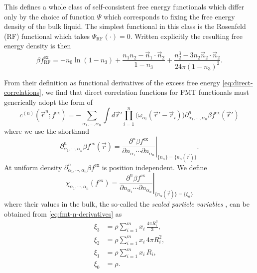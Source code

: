This defines a whole class of self-consistent free energy functionals which differ only by the choice of function $\Psi$ which corresponds to fixing the free energy density of the bulk liquid.
The simplest functional in this class is the Rosenfeld (RF) functional which takes $\Psi_\mathrm{RF}(\cdot) = 0$.
Written explicitly the resulting free energy density is then \cite{RosenfeldPRL1989}
\begin{equation}\label{eq:rosenfeld-functional}
  \beta f_\mathrm{RF}^\mathrm{ex}
  =
  - n_0 \ln{(1 - n_3)}
  + \frac{n_1 n_2 - \vec{n}_1 \cdot \vec{n}_2}{1 - n_3}
  + \frac{n_2^3 - 3 n_2 \vec{n}_2 \cdot \vec{n}_2}{24 \pi (1 - n_3)^2}.
\end{equation}

From their definition as functional derivatives of the excess free energy \eqref{eq:direct-correlations}, we find that direct correlation functions for FMT functionals must generically adopt the form of \cite{RosenfeldPRL1989}
\begin{equation}\label{eq:fmt-direct-correlations}
  c^{(n)}(\vec{r}^n; f^\mathrm{ex})
  =
  - \sum_{\alpha_1, \cdots, \alpha_n}
  \int d\vec{r}'
  \prod_{i=1}^n \Big( \omega_{\alpha_i}(\vec{r}' - \vec{r}_i) \Big)
  \partial^n_{\alpha_1, \cdots, \alpha_n} \beta f^\mathrm{ex}(\vec{r}')
\end{equation}
where we use the shorthand 
\begin{equation*}
  \partial^n_{\alpha_1, \cdots, \alpha_n} \beta f^\mathrm{ex}(\vec{r}) =
  \left.
  \frac{\partial^n \beta f^\mathrm{ex}}{\partial n_{\alpha_1} \cdots \partial n_{\alpha_n}}
  \right|_{\{n_\alpha\} = \{n_\alpha(\vec{r})\}}.
\end{equation*}
At uniform density $\partial^n_{\alpha_1, \cdots, \alpha_n} \beta f^\mathrm{ex}$ is position independent.
We define
\begin{equation}
  \chi_{\alpha_1, \cdots, \alpha_n}(f^\mathrm{ex})
  =
  \left.
  \frac{\partial^n \beta f^\mathrm{ex}}{\partial n_{\alpha_1} \cdots \partial n_{\alpha_n}}
  \right|_{\{n_\alpha(\vec{r})\} = \{\xi_\alpha\}}
\end{equation}
where their values in the bulk, the so-called the \emph{scaled particle variables}%
,
can be obtained from \eqref{eq:fmt-n-derivatives} as \cite{LebowitzJCP1965}
\begin{subequations}\label{eq:spt-variables}
  \begin{align}
    \xi_3
    &=
    \rho \sum_{i=1}^m x_i \,
    \frac{4 \pi R_i^3}{3},
    \\
    \xi_2
    &=
    \rho \sum_{i=1}^m x_i \,
    4 \pi R_i^2,
    \\
    \xi_1
    &=
    \rho \sum_{i=1}^m x_i \,
    R_i,
    \\
    \xi_0
    &=
    \rho.
  \end{align}
\end{subequations}
